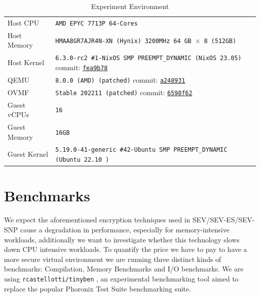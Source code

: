 \documentclass[twocolumn]{article}
\begin{document}
\begin{table}[ht]
    \small
    \centering
    \begin{tabular}{l|l}
        \hline
        Host CPU      & \texttt{AMD EPYC 7713P 64-Cores}                                            \\
        Host Memory   & \texttt{HMAA8GR7AJR4N-XN (Hynix) 3200MHz 64 GB $\times$ 8 (512GB)}          \\
        Host Kernel   & \texttt{6.3.0-rc2 \#1-NixOS SMP PREEMPT\_DYNAMIC (NixOS 23.05)} commit: \href{https://github.com/AMDESE/linux/tree/fea9b785bfa90e015c7d81526e36060da1bf01d1}{\texttt{fea9b78}}            \\
        QEMU          & \texttt{8.0.0 (AMD) (patched)} commit: \href{https://github.com/AMDESE/qemu/tree/a248931547843b9edb0f3b0c7d6d0c76ffdf7659}{\texttt{a248931}}                                             \\
        OVMF          & \texttt{Stable 202211 (patched)} commit: \href{https://github.com/AMDESE/ovmf/commit/6598f62bda4eb884c65d6c0aed7ede64258a41d8}{\texttt{6598f62}}                                     \\
        Guest vCPUs   & \texttt{16}                                                                 \\
        Guest Memory  & \texttt{16GB}                                                               \\
        Guest Kernel  & \texttt{5.19.0-41-generic \#42-Ubuntu SMP PREEMPT\_DYNAMIC (Ubuntu 22.10 )} \\ 
        \hline
    \end{tabular}
    \caption{Experiment Environment}
    \label{tab:experiment-environment}
\end{table}

\section{Benchmarks}
We expect the aforementioned encryption techniques used in SEV/SEV-ES/SEV-SNP cause a degradation in performance, especially for memory-intensive workloads, additionally we want to investigate whether this technology slows down CPU intensive workloads. To quantify the price we have to pay to have a more secure virtual environment we are running three distinct kinds of benchmarks: Compilation, Memory Benchmarks and I/O benchmarks. We are using \texttt{rcastellotti/tinyben} \cite{tinyben}, an experimental benchmarking tool aimed to replace the popular Phoronix Test Suite \cite{pts} benchmarking suite.
\end{document}
